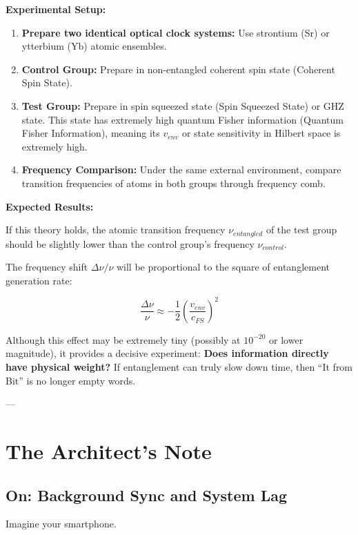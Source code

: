 \textbf{Experimental Setup:}

\begin{enumerate}
\item \textbf{Prepare two identical optical clock systems:} Use strontium (Sr) or ytterbium (Yb) atomic ensembles.

\item \textbf{Control Group:} Prepare in non-entangled coherent spin state (Coherent Spin State).

\item \textbf{Test Group:} Prepare in spin squeezed state (Spin Squeezed State) or GHZ state. This state has extremely high quantum Fisher information (Quantum Fisher Information), meaning its \textbf{$v_{env}$} or state sensitivity in Hilbert space is extremely high.

\item \textbf{Frequency Comparison:} Under the same external environment, compare transition frequencies of atoms in both groups through frequency comb.
\end{enumerate}

\textbf{Expected Results:}

If this theory holds, the atomic transition frequency \textbf{$\nu_{entangled}$} of the test group should be slightly lower than the control group's frequency \textbf{$\nu_{control}$}.

The frequency shift \textbf{$\Delta \nu / \nu$} will be proportional to the square of entanglement generation rate:

$$\frac{\Delta \nu}{\nu} \approx -\frac{1}{2} \left( \frac{v_{env}}{c_{FS}} \right)^2$$

Although this effect may be extremely tiny (possibly at \textbf{$10^{-20}$} or lower magnitude), it provides a decisive experiment: \textbf{Does information directly have physical weight?} If entanglement can truly slow down time, then ``It from Bit'' is no longer empty words.

---

\section{The Architect's Note}

\subsection{On: Background Sync and System Lag}

Imagine your smartphone.

